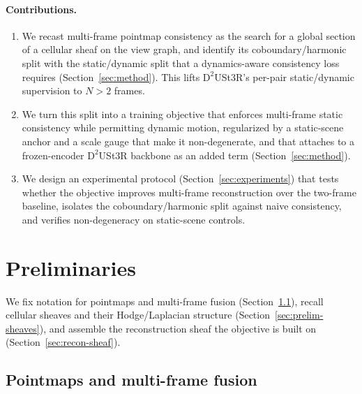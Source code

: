 \documentclass{article}
\theoremstyle{definition}
\theoremstyle{plain}
\theoremstyle{remark}
\begin{document}
\paragraph{Contributions.}
\begin{enumerate}[leftmargin=1.4em,itemsep=0.15em,topsep=0.2em]
  \item We recast multi-frame pointmap consistency as the search for a
        global section of a cellular sheaf on the view graph, and identify
        its coboundary/harmonic split with the static/dynamic split that a
        dynamics-aware consistency loss requires
        (Section~\ref{sec:method}). This lifts $\mathrm{D}^2$USt3R's
        per-pair static/dynamic supervision to $N>2$ frames.
  \item We turn this split into a training objective that enforces
        multi-frame static consistency while permitting dynamic motion,
        regularized by a static-scene anchor and a scale gauge that make
        it non-degenerate, and that attaches to a frozen-encoder
        $\mathrm{D}^2$USt3R backbone as an added term
        (Section~\ref{sec:method}).
  \item We design an experimental protocol (Section~\ref{sec:experiments})
        that tests whether the objective improves multi-frame
        reconstruction over the two-frame baseline, isolates the
        coboundary/harmonic split against naive consistency, and verifies
        non-degeneracy on static-scene controls.
\end{enumerate}

\section{Preliminaries}
\label{sec:prelim}

We fix notation for pointmaps and multi-frame fusion
(Section~\ref{sec:prelim-pointmaps}), recall cellular sheaves and their
Hodge/Laplacian structure (Section~\ref{sec:prelim-sheaves}), and assemble
the reconstruction sheaf the objective is built on
(Section~\ref{sec:recon-sheaf}).

\subsection{Pointmaps and multi-frame fusion}
\label{sec:prelim-pointmaps}
\end{document}
